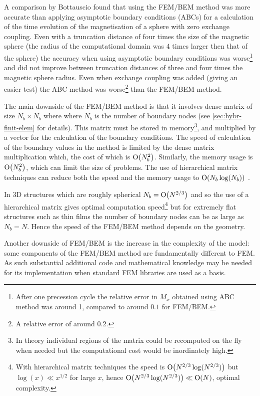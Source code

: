 A comparison by Bottauscio \cite{Bottauscio2008} found that using the FEM/BEM method was more accurate than applying asymptotic boundary conditions (ABCs) for a calculation of the time evolution of the magnetisation of a sphere with zero exchange coupling.
Even with a truncation distance of four times the size of the magnetic sphere (\ie the radius of the computational domain was $4$ times larger then that of the sphere) the accuracy when using asymptotic boundary conditions was worse\footnote{After one precession cycle the relative error in $M_x$ obtained using ABC method was around 1, compared to around $0.1$ for FEM/BEM.} and did not improve between truncation distances of three and four times the magnetic sphere radius.
Even when exchange coupling was added (giving an easier test) the ABC method was worse\footnote{A relative error of around $0.2$.} than the FEM/BEM method.

The main downside of the FEM/BEM method is that it involves dense matrix of size $N_b \times N_b$ where where $N_b$ is the number of boundary nodes (see \cref{sec:hybr-finit-elem} for details).
This matrix must be stored in memory\footnote{In theory individual regions of the matrix could be recomputed on the fly when needed but the computational cost would be inordinately high.}, and multiplied by a vector for the calculation of the boundary conditions.
The speed of calculation of the boundary values in the method is limited by the dense matrix multiplication which, the cost of which is $\mathrm{O}{\left( N_b^2 \right)}$.
Similarly, the memory usage is $\mathrm{O}{\left( N_b^2 \right)}$, which can limit the size of problems.
The use of hierarchical matrix techniques can reduce both the speed and the memory usage to $\mathrm{O}{\left( N_b \log(N_b) \right)}$ \cite{Knittel2009}.

In 3D structures which are roughly spherical $N_b = \mathrm{O}{\left( N^{2/3} \right)}$ and so the use of a hierarchical matrix gives optimal computation speed\footnote{With hierarchical matrix techniques the speed is $\mathrm{O}{\left( N^{2/3}\log(N^{2/3}) \right)}$ but $\log(x) \ll x^{1/2}$ for large $x$, hence $\mathrm{O}{\left( N^{2/3}\log(N^{2/3}) \right)} \ll \mathrm{O}{\left( N \right)}$, \ie optimal complexity.} but for extremely flat structures such as thin films the number of boundary nodes can be as large as $N_b = N$.
Hence the speed of the FEM/BEM method depends on the geometry.

Another downside of FEM/BEM is the increase in the complexity of the model: some components of the FEM/BEM method are fundamentally different to FEM.
As such substantial additional code and mathematical knowledge may be needed for its implementation when standard FEM libraries are used as a basis.


